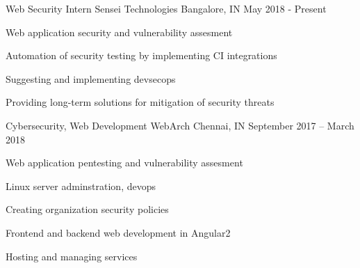 \documentclass[]{awesome-cv}
\begin{document}
\vspace{-10mm}
\begin{cventries}
	\cventry
	{Web Security Intern}
	{Sensei Technologies}
	{Bangalore, IN}
	{May 2018 - Present}
	{\begin{cvitems}
		\item {Web application security and vulnerability assesment}
		\item {Automation of security testing by implementing CI integrations}
		\item {Suggesting and implementing devsecops}
		\item {Providing long-term solutions for mitigation of security threats}
	\end{cvitems}}
	\cventry
	{Cybersecurity, Web Development}
	{WebArch}
	{Chennai, IN}
	{September 2017 – March 2018}
	{\begin{cvitems}
		\item {Web application pentesting and vulnerability assesment}
		\item {Linux server adminstration, devops}
		\item {Creating organization security policies}
		\item {Frontend and backend web development in Angular2}
		\item {Hosting and managing services}
	\end{cvitems}}
\end{cventries}
\end{document}
